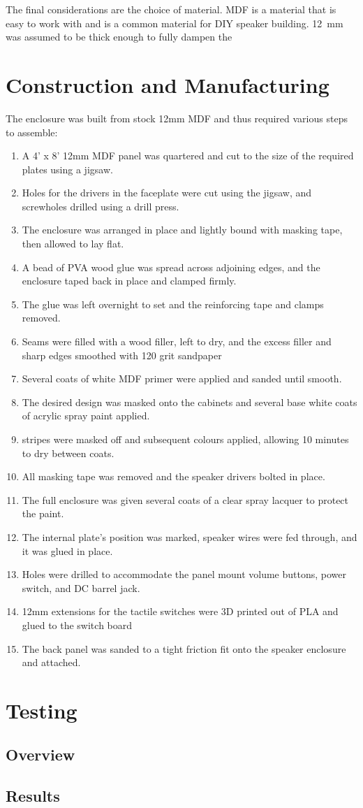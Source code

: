 \documentclass[main.tex]{subfiles}
\begin{document}
The final considerations are the choice of material.
MDF is a material that is easy to work with and is a common material for DIY speaker building.
\SI{12}{\milli\metre} was assumed to be thick enough to fully dampen the 
\section{Construction and Manufacturing}

The enclosure was built from stock 12mm MDF and thus required various steps to assemble:

\begin{enumerate}
    \item A 4' x 8' 12mm MDF panel was quartered and cut to the size of the required plates using a jigsaw.
    \item Holes for the drivers in the faceplate were cut using the jigsaw, and screwholes drilled using a drill press.
    \item The enclosure was arranged in place and lightly bound with masking tape, then allowed to lay flat.
    \item A bead of PVA wood glue was spread across adjoining edges, and the enclosure taped back in place and clamped firmly.
    \item The glue was left overnight to set and the reinforcing tape and clamps removed.
    \item Seams were filled with a wood filler, left to dry, and the excess filler and sharp edges smoothed with 120 grit sandpaper
    \item Several coats of white MDF primer were applied and sanded until smooth.
    \item The desired design was masked onto the cabinets and several base white coats of acrylic spray paint applied.
    \item stripes were masked off and subsequent colours applied, allowing 10 minutes to dry between coats.
    \item All masking tape was removed and the speaker drivers bolted in place.
    \item The full enclosure was given several coats of a clear spray lacquer to protect the paint.
    \item The internal plate's position was marked, speaker wires were fed through, and it was glued in place.
    \item Holes were drilled to accommodate the panel mount volume buttons, power switch, and DC barrel jack.
    \item 12mm extensions for the tactile switches were 3D printed out of PLA and glued to the switch board
    \item The back panel was sanded to a tight friction fit onto the speaker enclosure and attached.
\end{enumerate}

\section{Testing}
\subsection{Overview}
\subsection{Results}
\end{document}

